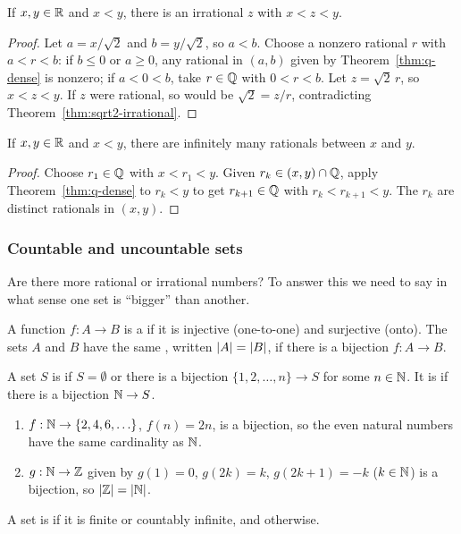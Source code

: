 \begin{cor}
  If $x, y \in \mathbb{R}$ and $x < y$, there is an irrational $z$ with $x < z < y$.
\end{cor}

\begin{proof}
  Let $a = x/\sqrt{2}$ and $b = y/\sqrt{2}$, so $a < b$. Choose a nonzero
  rational $r$ with $a < r < b$: if $b \leq 0$ or $a \geq 0$, any rational
  in $(a, b)$ given by Theorem~\ref{thm:q-dense} is nonzero; if $a < 0 < b$,
  take $r \in \mathbb{Q}$ with $0 < r < b$. Let $z = \sqrt{2}\,r$, so $x < z < y$.
  If $z$ were rational, so would be $\sqrt{2} = z/r$, contradicting
  Theorem~\ref{thm:sqrt2-irrational}.
\end{proof}

\begin{cor}
  If $x, y \in \mathbb{R}$ and $x < y$, there are infinitely many rationals between
  $x$ and $y$.
\end{cor}

\begin{proof}
  Choose $r_1 \in \mathbb{Q}$ with $x < r_1 < y$. Given $r_k \in (x, y) \cap \mathbb{Q}$,
  apply Theorem~\ref{thm:q-dense} to $r_k < y$ to get $r_{k + 1} \in \mathbb{Q}$ with
  $r_k < r_{k + 1} < y$. The $r_k$ are distinct rationals in $(x, y)$.
\end{proof}

\subsubsection*{Countable and uncountable sets}
Are there more rational or irrational numbers? To answer this we need to
say in what sense one set is ``bigger'' than another.

\begin{defi}[Cardinality]
  A function $f : A \to B$ is a  if it is injective
  (one-to-one) and surjective (onto). The sets $A$ and $B$ have the same
  , written $\left\lvert A\right\rvert = \left\lvert B\right\rvert$, if there is a bijection
  $f : A \to B$.
\end{defi}

\begin{defi}
  A set $S$ is  if $S = \emptyset$ or there is a bijection
  $\{1, 2, \ldots, n\} \to S$ for some $n \in \mathbb{N}$. It is  if there is a bijection $\mathbb{N} \to S$.
\end{defi}

\begin{eg}\leavevmode
  \begin{enumerate}[label=(\alph*)]
    \item $f : \mathbb{N} \to \{2, 4, 6, \ldots\}$, $f(n) = 2n$, is a bijection, so
      the even natural numbers have the same cardinality as $\mathbb{N}$.
    \item $g : \mathbb{N} \to \mathbb{Z}$ given by $g(1) = 0$, $g(2k) = k$,
      $g(2k + 1) = -k$ ($k \in \mathbb{N}$) is a bijection, so $\left\lvert \mathbb{Z}\right\rvert = \left\lvert \mathbb{N}\right\rvert$.
  \end{enumerate}
\end{eg}

\begin{defi}
  A set is  if it is finite or countably infinite, and
   otherwise.
\end{defi}
